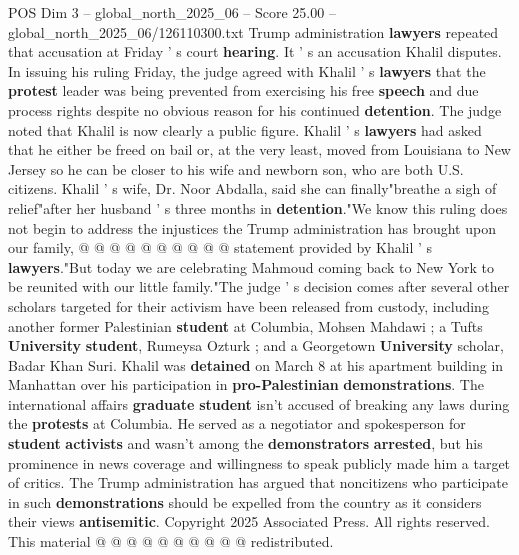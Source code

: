 \begin{textsample}{POS Dim 3 – global\_north\_2025\_06 – Score 25.00 – global\_north\_2025\_06/126110300.txt}
Trump administration \textbf{lawyers} repeated that accusation at Friday ' s court \textbf{hearing}.
It ' s an accusation Khalil disputes.
In issuing his ruling Friday, the judge agreed with Khalil ' s \textbf{lawyers} that the \textbf{protest} leader was being prevented from exercising his free \textbf{speech} and due process rights despite no obvious reason for his continued \textbf{detention}.
The judge noted that Khalil is now clearly a public figure.
Khalil ' s \textbf{lawyers} had asked that he either be freed on bail or, at the very least, moved from Louisiana to New Jersey so he can be closer to his wife and newborn son, who are both U.S. citizens.
Khalil ' s wife, Dr.
Noor Abdalla, said she can finally"breathe a sigh of relief"after her husband ' s three months in \textbf{detention}."We know this ruling does not begin to address the injustices the Trump administration has brought upon our family, @ @ @ @ @ @ @ @ @ @ statement provided by Khalil ' s \textbf{lawyers}."But today we are celebrating Mahmoud coming back to New York to be reunited with our little family."The judge ' s decision comes after several other scholars targeted for their activism have been released from custody, including another former Palestinian \textbf{student} at Columbia, Mohsen Mahdawi ; a Tufts \textbf{University} \textbf{student}, Rumeysa Ozturk ; and a Georgetown \textbf{University} scholar, Badar Khan Suri.
Khalil was \textbf{detained} on March 8 at his apartment building in Manhattan over his participation in \textbf{pro-Palestinian} \textbf{demonstrations}.
The international affairs \textbf{graduate} \textbf{student} isn't accused of breaking any laws during the \textbf{protests} at Columbia.
He served as a negotiator and spokesperson for \textbf{student} \textbf{activists} and wasn't among the \textbf{demonstrators} \textbf{arrested}, but his prominence in news coverage and willingness to speak publicly made him a target of critics.
The Trump administration has argued that noncitizens who participate in such \textbf{demonstrations} should be expelled from the country as it considers their views \textbf{antisemitic}.
Copyright 2025 Associated Press.
All rights reserved.
This material @ @ @ @ @ @ @ @ @ @ redistributed.

\end{textsample}
